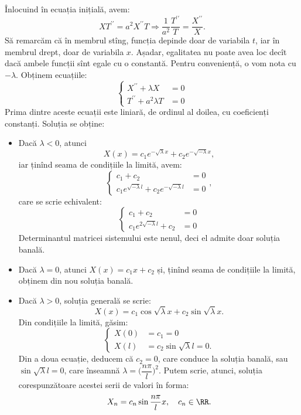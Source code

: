 Înlocuind în ecuația inițială, avem:
\[
  XT^{\prime\prime} = a^2X^{\prime\prime} T \Rightarrow %
  \dfrac{1}{a^2} \dfrac{T^{\prime\prime}}{T} = \dfrac{X^{\prime\prime}}{X}.
\]
Să remarcăm că în membrul stîng, funcția depinde doar de variabila $ t $, iar în
membrul drept, doar de variabila $ x $. Așadar, egalitatea nu poate avea loc
decît dacă ambele funcții sînt egale cu o constantă. Pentru conveniență, o vom nota
cu $ -\lambda $. Obținem ecuațiile:
\[
  \begin{cases}
    X^{\prime\prime} + \lambda X &= 0 \\
    T^{\prime\prime} + a^2\lambda T &= 0
  \end{cases}
\]
Prima dintre aceste ecuații este liniară, de ordinul al doilea, cu coeficienți
constanți. Soluția se obține:
\begin{itemize}
\item Dacă $ \lambda < 0 $, atunci
  \[
    X(x) = c_1 e^{-\sqrt{\lambda}x} + c_2 e^{-\sqrt{-\lambda} x},
  \]
  iar ținînd seama de condițiile la limită, avem:
  \[
    \begin{cases}
      c_1 + c_2 &= 0 \\
      c_1 e^{\sqrt{-\lambda} l} + c_2e^{-\sqrt{-\lambda} l} &= 0
    \end{cases},
  \]
  care se scrie echivalent:
  \[
    \begin{cases}
      c_1 + c_2 &= 0 \\
      c_1 e^{2\sqrt{-\lambda} l} + c_2 &= 0
    \end{cases}
  \]
  Determinantul matricei sistemului este nenul, deci el admite doar soluția banală.
\item Dacă $ \lambda = 0 $, atunci $ X(x) = c_1 x + c_2 $ și, ținînd seama de
  condițiile la limită, obținem din nou soluția banală.
\item Dacă $ \lambda > 0 $, soluția generală se scrie:
  \[
    X(x) = c_1 \cos \sqrt{\lambda} x + c_2 \sin \sqrt{\lambda} x.
  \]
  Din condițiile la limită, găsim:
  \[
    \begin{cases}
      X(0) &= c_1 = 0 \\
      X(l) &= c_2 \sin \sqrt{\lambda} l = 0.
    \end{cases}
  \]
  Din a doua ecuație, deducem că $ c_2 = 0 $, care conduce la soluția banală, sau
  $ \sin \sqrt{\lambda} l = 0 $, care înseamnă $ \lambda = \big(\dfrac{n\pi}{l}\big)^2 $.
  Putem scrie, atunci, soluția corespunzătoare acestei serii de valori în forma:
  \[
    X_n = c_n \sin \dfrac{n\pi}{l} x, \quad c_n \in \RR.
  \]
\end{itemize}

